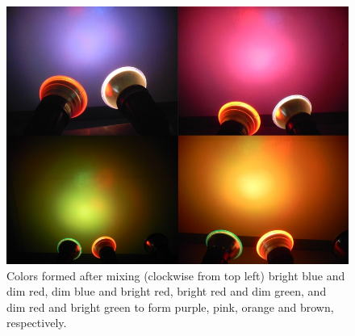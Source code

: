\documentclass[twoside]{article}
\begin{document}
\captionsetup[figure]{width=5in}
\begin{figure}[h!]
\centering
\includegraphics[scale=0.4]{advadd}
\caption{Colors formed after mixing (clockwise from top left) bright blue and dim red, dim blue and bright red, bright red and dim green, and dim red and bright green to form purple, pink, orange and brown, respectively.}
\label{fig:phasediff}
\end{figure}
\end{document}

